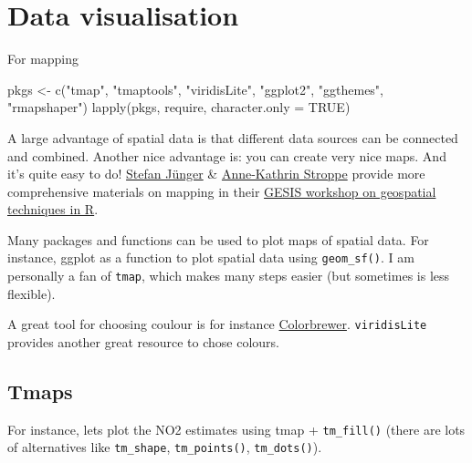 \documentclass[
  letterpaper,
  DIV=11,
  numbers=noendperiod]{scrreprt}
\newenvironment{Shaded}{\begin{snugshade}}{\end{snugshade}}
\newcommand{\AttributeTok}[1]{\textcolor[rgb]{0.40,0.45,0.13}{#1}}
\newcommand{\ConstantTok}[1]{\textcolor[rgb]{0.56,0.35,0.01}{#1}}
\newcommand{\FunctionTok}[1]{\textcolor[rgb]{0.28,0.35,0.67}{#1}}
\newcommand{\NormalTok}[1]{\textcolor[rgb]{0.00,0.23,0.31}{#1}}
\newcommand{\OtherTok}[1]{\textcolor[rgb]{0.00,0.23,0.31}{#1}}
\newcommand{\StringTok}[1]{\textcolor[rgb]{0.13,0.47,0.30}{#1}}
\begin{document}
\hypertarget{data-visualisation}{%
\section{Data visualisation}\label{data-visualisation}}

For mapping

\begin{Shaded}
\begin{Highlighting}[]
\NormalTok{pkgs }\OtherTok{\textless{}{-}} \FunctionTok{c}\NormalTok{(}\StringTok{"tmap"}\NormalTok{, }\StringTok{"tmaptools"}\NormalTok{, }\StringTok{"viridisLite"}\NormalTok{, }
          \StringTok{"ggplot2"}\NormalTok{, }\StringTok{"ggthemes"}\NormalTok{, }\StringTok{"rmapshaper"}\NormalTok{) }
\FunctionTok{lapply}\NormalTok{(pkgs, require, }\AttributeTok{character.only =} \ConstantTok{TRUE}\NormalTok{)}
\end{Highlighting}
\end{Shaded}

A large advantage of spatial data is that different data sources can be
connected and combined. Another nice advantage is: you can create very
nice maps. And it's quite easy to do!
\href{https://stefanjuenger.github.io/}{Stefan Jünger} \&
\href{https://www.gesis.org/institut/mitarbeitendenverzeichnis/person/Anne-Kathrin.Stroppe}{Anne-Kathrin
Stroppe} provide more comprehensive materials on mapping in their
\href{https://github.com/StefanJuenger/gesis-workshop-geospatial-techniques-R-2023}{GESIS
workshop on geospatial techniques in R}.

Many packages and functions can be used to plot maps of spatial data.
For instance, ggplot as a function to plot spatial data using
\texttt{geom\_sf()}. I am personally a fan of \texttt{tmap}, which makes
many steps easier (but sometimes is less flexible).

A great tool for choosing coulour is for instance
\href{https://colorbrewer2.org/}{Colorbrewer}. \texttt{viridisLite}
provides another great resource to chose colours.

\hypertarget{tmaps}{%
\subsection{Tmaps}\label{tmaps}}

For instance, lets plot the NO2 estimates using tmap +
\texttt{tm\_fill()} (there are lots of alternatives like
\texttt{tm\_shape}, \texttt{tm\_points()}, \texttt{tm\_dots()}).
\end{document}
